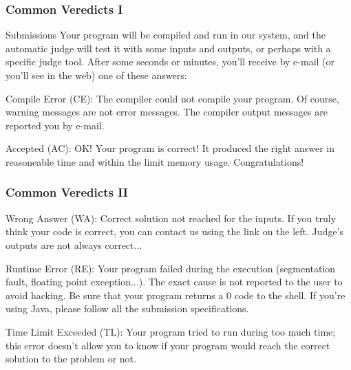 \documentclass{beamer}
\begin{document}
\begin{frame}
	\frametitle {Common Veredicts I}
	\begin{block}{Submissions}
	Your program will be compiled and run in our system, and the automatic judge will test 		it with some inputs and outputs, or perhaps with a specific judge tool. After some 			seconds	or minutes, you'll receive by e-mail (or you'll see in the web) one of these 			answers:
	\end{block}
	
	\begin{block}{Compile Error (CE):}
	The compiler could not compile your program. Of course, warning messages are not error messages. The compiler output messages are reported you by e-mail.
	\end{block}
	
	\begin{block}{Accepted (AC):}
	OK! Your program is correct! It produced the right answer in reasoneable time and within the limit memory usage. Congratulations!
	\end{block}
	
	

\end{frame}

\begin{frame}
	\frametitle {Common Veredicts II}
	
	\begin{block}{Wrong Answer (WA):}
	Correct solution not reached for the inputs. 
	If you truly think your code is correct, you can contact us using the link on the left. Judge's outputs are not always correct...
	\end{block}
	
	\begin{block}{Runtime Error (RE):}
	Your program failed during the execution (segmentation fault, floating point exception...). The exact cause is not reported to the user to avoid hacking. Be sure that your program returns a 0 code to the shell. If you're using Java, please follow all the submission specifications.
	\end{block}
	
	\begin{block}{Time Limit Exceeded (TL):}
	Your program tried to run during too much time; this error doesn't allow you to know if your program would reach the correct solution to the problem or not.
	\end{block}
	
\end{frame}
	
\end{document}
